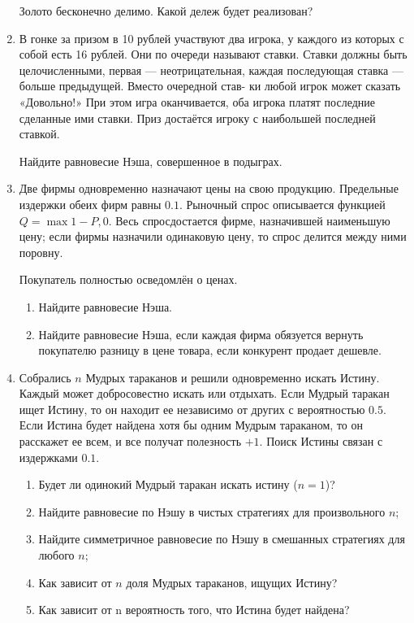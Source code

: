 \documentclass[12pt]{article} %
\theoremstyle{definition} %
\begin{document}
\begin{enumerate}
Золото бесконечно делимо. Какой дележ будет реализован?


\item В гонке за призом в 10 рублей участвуют два игрока, у каждого из которых с собой есть 16
рублей. Они по очереди называют ставки. Ставки должны быть целочисленными, первая —
неотрицательная, каждая последующая ставка — больше предыдущей. Вместо очередной став-
ки любой игрок может сказать «Довольно!» При этом игра оканчивается, оба игрока платят
последние сделанные ими ставки. Приз достаётся игроку с наибольшей последней ставкой.

Найдите равновесие Нэша, совершенное в подыграх.

\newpage
\item Две фирмы одновременно назначают цены на свою продукцию. 
Предельные издержки обеих фирм равны $0.1$.
Рыночный спрос описывается функцией $Q = \max {1 - P, 0}$. 
Весь спросдостается фирме, назначившей наименьшую цену; 
если фирмы назначили одинаковую цену, то спрос делится между ними поровну.

Покупатель полностью осведомлён о ценах. 


\begin{enumerate}
  \item Найдите равновесие Нэша.
  \item Найдите равновесие Нэша, если каждая фирма обязуется вернуть покупателю разницу в цене товара, если конкурент продает дешевле.
\end{enumerate}

\item Собрались $n$ Мудрых тараканов и решили одновременно искать Истину. 
Каждый может добросовестно искать или отдыхать. 
Если Мудрый таракан ищет Истину, то он находит ее независимо от
других с вероятностью $0.5$. 
Если Истина будет найдена хотя бы одним Мудрым тараканом, то он
расскажет ее всем, и все получат полезность $+1$. 
Поиск Истины связан с издержками $0.1$.

\begin{enumerate}
  \item Будет ли одинокий Мудрый таракан искать истину ($n = 1$)?
  \item Найдите равновесие по Нэшу в чистых стратегиях для произвольного $n$;
  \item Найдите симметричное равновесие по Нэшу в смешанных стратегиях для любого $n$;
  \item Как зависит от $n$ доля Мудрых тараканов, ищущих Истину?
  \item Как зависит от n вероятность того, что Истина будет найдена?
\end{enumerate}


\end{enumerate}
\end{document}
